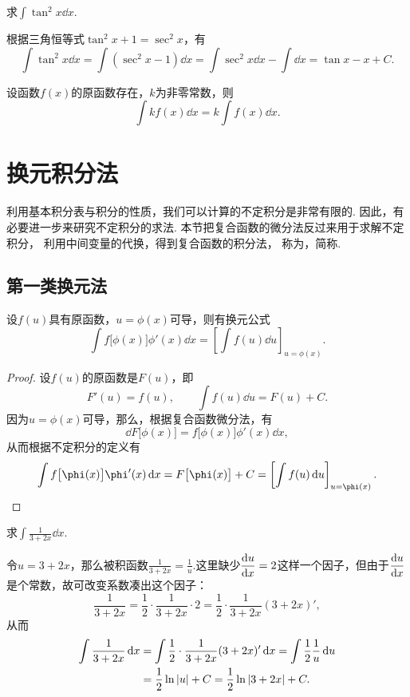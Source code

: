 \begin{example}
求\(\int \tan^2 x \dd{x}\).
\begin{solution}
根据三角恒等式\(\tan^2 x + 1 = \sec^2 x\)，有\[
\int \tan^2 x \dd{x}
= \int (\sec^2 x - 1) \dd{x}
= \int \sec^2 x \dd{x} - \int \dd{x}
= \tan x - x + C.
\]
\end{solution}
\end{example}

\begin{property}
设函数\(f(x)\)的原函数存在，\(k\)为非零常数，则\[
\int k f(x) \dd{x} = k \int f(x) \dd{x}.
\]
\end{property}

\section{换元积分法}
利用基本积分表与积分的性质，我们可以计算的不定积分是非常有限的.
因此，有必要进一步来研究不定积分的求法.
本节把复合函数的微分法反过来用于求解不定积分，
利用中间变量的代换，得到复合函数的积分法，
称为，简称.

\subsection{第一类换元法}
\begin{theorem}
设\(f(u)\)具有原函数，\(u=\phi(x)\)可导，则有换元公式\[
\int f\bigl[\phi(x)\bigr] \phi'(x) \dd{x} = \left[ \int f(u) \dd{u} \right]_{u=\phi(x)}.
\]
\begin{proof}
设\(f(u)\)的原函数是\(F(u)\)，即\[
F'(u) = f(u),
\qquad
\int f(u) \dd{u} = F(u) + C.
\]因为\(u = \phi(x)\)可导，那么，根据复合函数微分法，有\[
\dd{F\bigl[\phi(x)\bigr]} = f\bigl[\phi(x)\bigr] \phi'(x) \dd{x},
\]从而根据不定积分的定义有\[
\int f\bigl[\phi(x)\bigr] \phi'(x) \dd{x}
= F\bigl[\phi(x)\bigr] + C
= \left[ \int f(u) \dd{u} \right]_{u=\phi(x)}.
\qedhere
\]
\end{proof}
\end{theorem}

\begin{example}
求\(\int \frac{1}{3+2x} \dd{x}\).
\begin{solution}
令\(u = 3+2x\)，那么被积函数\(\frac{1}{3+2x} = \frac{1}{u}\).这里缺少\(\displaystyle\dv{u}{x}=2\)这样一个因子，但由于\(\displaystyle\dv{u}{x}\)是个常数，故可改变系数凑出这个因子：\[
\frac{1}{3+2x} = \frac{1}{2} \cdot \frac{1}{3+2x} \cdot 2 = \frac{1}{2} \cdot \frac{1}{3+2x} (3+2x)',
\]从而\begin{align*}
\int \frac{1}{3+2x} \dd{x}
&= \int \frac{1}{2} \cdot \frac{1}{3+2x} (3+2x)' \dd{x}
= \int \frac{1}{2} \frac{1}{u} \dd{u} \\
&= \frac{1}{2} \ln\abs{u} + C
= \frac{1}{2} \ln\abs{3+2x} + C.
\end{align*}
\end{solution}
\end{example}

